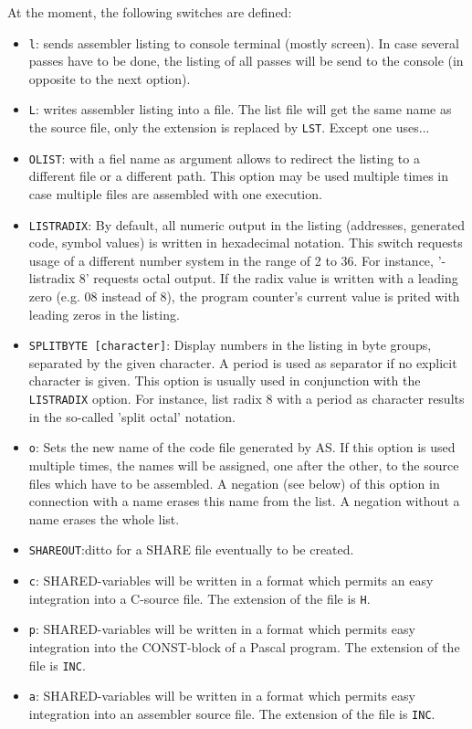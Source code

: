 \documentclass[12pt,twoside]{report}
\makeatletter
\newcommand{\tty}[1]{{\tt #1}}
\newcommand{\ttindex}[1]{\index{#1@{\tt #1}}}
\newcommand{\asname}{{AS}}
\makeatother
\begin{document}
At the moment, the following switches are defined:
\ttindex{SHARED}
\begin{itemize}
\item{\tty{l}: sends assembler listing to console terminal (mostly screen).
      In case several passes have to be done, the listing of all
      passes will be send to the console (in opposite to the next
      option).}
\item{\tty{L}: writes assembler listing into a file. The list file will get
      the same name as the source file, only the extension is
      replaced by \tty{LST}.  Except one uses... }
\item{\tty{OLIST}: with a fiel name as argument allows to redirect the
      listing to a different file or a different path.  This option may
      be used multiple times in case multiple files are assembled with
      one execution.}
\item{\label{listradix}\tty{LISTRADIX}: By default, all numeric output in the listing
      (addresses, generated code, symbol values) is written in hexadecimal
      notation.  This switch requests usage of a different number system in the
      range of 2 to 36.  For instance, '-listradix 8' requests octal output.
      If the radix value is written with a leading zero (e.g. 08 instead of 8),
      the program counter's current value is prited with leading zeros in
      the listing.}
\item{\tty{SPLITBYTE [character]}: Display numbers in the listing in byte groups,
      separated by the given character.  A period is used as separator if
      no explicit character is given.  This option is usually used in conjunction
      with the \tty{LISTRADIX} option.  For instance, list radix 8 with a
      period as character results in the so-called 'split octal' notation.}
\item{\tty{o}: Sets the new name of the code file generated by \asname{}.  If this
      option is used multiple times, the names will be assigned, one
      after the other, to the source files which have to be
      assembled.  A negation (see below) of this option in
      connection with a name erases this name from the list.  A
      negation without a name erases the whole list.}
\item{\tty{SHAREOUT}:ditto for a SHARE file eventually to be created.}
\item{\tty{c}: SHARED-variables will be written in a format which permits
      an easy integration into a C-source file.  The extension of
      the file is \tty{H}.}
\item{\tty{p}: SHARED-variables will be written in a format which permits
      easy integration into the CONST-block of a Pascal program.
      The extension of the file is \tty{INC}.}
\item{\tty{a}: SHARED-variables will be written in a format which permits
      easy integration into an assembler source file. The
      extension of the file is \tty{INC}.}
\end{itemize}
\end{document}
